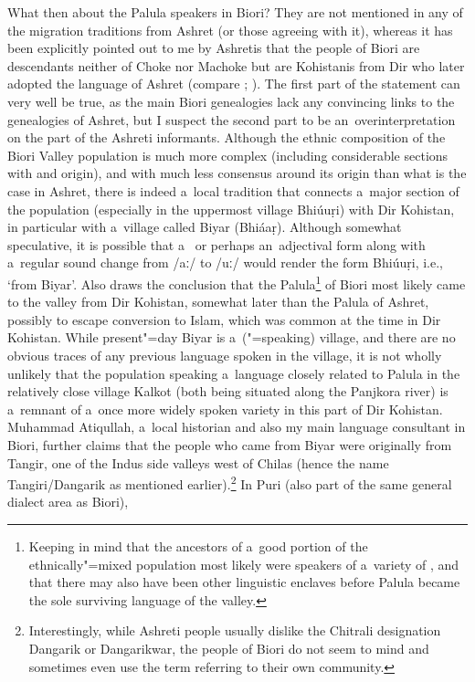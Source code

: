 What then about the Palula speakers in Biori? They are not mentioned in any of the migration
traditions from Ashret (or those agreeing with it), whereas it has been explicitly pointed out to me
by Ashretis that the people of Biori are descendants neither of Choke nor Machoke but are Kohistanis
from Dir who later adopted the language of Ashret (compare \citealt[255]{strand2001};
\citealt[296]{saeed2001}). The first part of the statement can very well be true, as the main Biori
genealogies lack any convincing links to the genealogies of Ashret, but I suspect the second part to
be an~overinterpretation on the part of the Ashreti informants. Although the ethnic composition of
the Biori Valley population is much more complex (including considerable sections with \iliKalasha and
\iliNuristani origin), and with much less consensus around its origin than what is the case in Ashret,
there is indeed a~local tradition that connects a~major section of the population (especially in the
uppermost village Bhiúuṛi) with Dir Kohistan, in particular with a~village called Biyar
(Bhiáaṛ). Although somewhat speculative, it is possible that a~ or perhaps an~adjectival
form along with a~regular sound change from ‌/aː/ to /uː/ would render the form Bhiúuṛi,
i.e., `from Biyar'. Also \citet[111--108]{cacopardo2001} draws the conclusion that the
Palula\footnote{Keeping in mind that the ancestors of a~good portion of the ethnically"=mixed
  population most likely were speakers of a~variety of \iliKalasha, and that there may also have been
  other linguistic enclaves before Palula became the sole surviving language of the valley.} of
Biori most likely came to the valley from Dir Kohistan, somewhat later than the Palula of Ashret,
possibly to escape conversion to Islam, which was common at the time in Dir Kohistan. While
present"=day Biyar is a~\iliKohistani (\iliGawri"=speaking) village, and there are no obvious traces of any
previous language spoken in the village, it is not wholly unlikely that the population speaking
a~language closely related to Palula in the relatively close village Kalkot (both being situated
along the Panjkora river) is a~remnant of a~once more widely spoken \iliShina variety in this part of
Dir Kohistan. Muhammad Atiqullah, a~local historian and also my main language consultant in Biori, further
claims that the people who came from Biyar were originally from Tangir, one of the Indus side
valleys west of Chilas (hence the name Tangiri/Dangarik as mentioned
earlier).\footnote{Interestingly, while Ashreti people usually dislike the Chitrali designation
  Dangarik or Dangarikwar, the people of Biori do not seem to mind and sometimes even use the term
  referring to their own community.} In Puri (also part of the same general dialect area as Biori),
